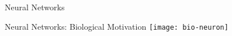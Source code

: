 
\begin{frame}
  \centering
  \Huge
  \color{orange}
  \vspace{0.2cm}
  Neural Networks
  \vspace{0.5cm}

\end{frame}

\begin{slide}{Neural Networks: Biological Motivation}
  \centering
  \texttt{[image: bio-neuron]}
  \begin{flushleft}\cite{karpathy1}\end{flushleft}
\end{slide}

